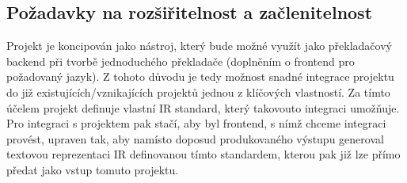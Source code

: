 \documentclass{article}
\def\xxx#1{\textcolor{red!50}{\itshape #1}}
\begin{document}

\subsection{Požadavky na rozšiřitelnost a začlenitelnost}

Projekt je koncipován jako nástroj, který bude možné využít jako překladačový backend při tvorbě jednoduchého překladače (doplněním o frontend pro požadovaný jazyk). Z tohoto důvodu je tedy možnost snadné integrace projektu do již existujících/vznikajících projektů jednou z klíčových vlastností. Za tímto účelem projekt definuje vlastní IR standard, který takovouto integraci umožňuje. Pro integraci s projektem pak stačí, aby byl frontend, s nímž chceme integraci provést, upraven tak, aby namísto doposud produkovaného výstupu generoval textovou reprezentaci IR definovanou tímto standardem, kterou pak již lze přímo předat jako vstup tomuto projektu.
\end{document}
